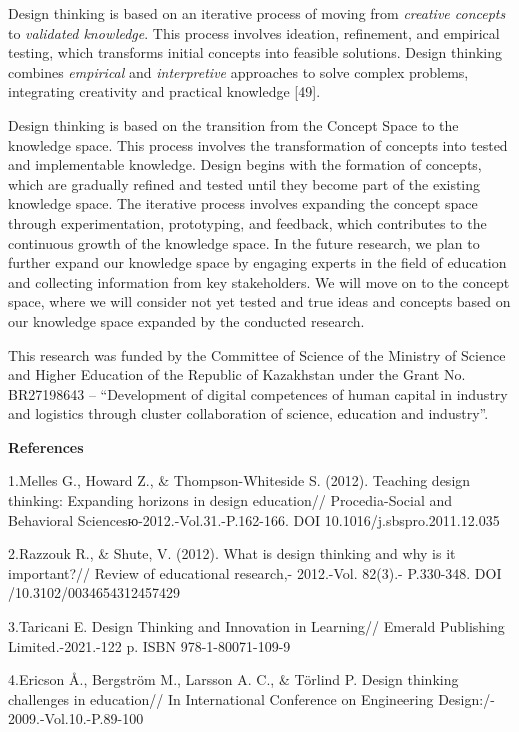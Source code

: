 Design thinking is based on an iterative process of moving from
\emph{creative concepts} to \emph{validated knowledge}. This process
involves ideation, refinement, and empirical testing, which transforms
initial concepts into feasible solutions. Design thinking combines
\emph{empirical} and \emph{interpretive} approaches to solve complex
problems, integrating creativity and practical knowledge {[}49{]}.

Design thinking is based on the transition from the Concept Space to the
knowledge space. This process involves the transformation of concepts
into tested and implementable knowledge. Design begins with the
formation of concepts, which are gradually refined and tested until they
become part of the existing knowledge space. The iterative process
involves expanding the concept space through experimentation,
prototyping, and feedback, which contributes to the continuous growth of
the knowledge space. In the future research, we plan to further expand
our knowledge space by engaging experts in the field of education and
collecting information from key stakeholders. We will move on to the
concept space, where we will consider not yet tested and true ideas and
concepts based on our knowledge space expanded by the conducted
research.

This research was funded by the Committee of Science of the Ministry of
Science and Higher Education of the Republic of Kazakhstan under the
Grant No. BR27198643 -- ``Development of digital competences of human
capital in industry and logistics through cluster collaboration of
science, education and industry''.

{\bfseries References}

1.Melles G., Howard Z., \& Thompson-Whiteside S. (2012). Teaching design
thinking: Expanding horizons in design education// Procedia-Social and
Behavioral Sciencesю-2012.-Vol.31.-P.162-166. DOI
10.1016/j.sbspro.2011.12.035

2.Razzouk R., \& Shute, V. (2012). What is design thinking and why is it
important?// Review of educational research,- 2012.-Vol. 82(3).-
P.330-348. DOI /10.3102/0034654312457429

3.Taricani E. Design Thinking and Innovation in Learning// Emerald
Publishing Limited.-2021.-122 p. ISBN 978-1-80071-109-9

4.Ericson Å., Bergström M., Larsson A. C., \& Törlind P. Design thinking
challenges in education// In International Conference on Engineering
Design:/- 2009.-Vol.10.-P.89-100


